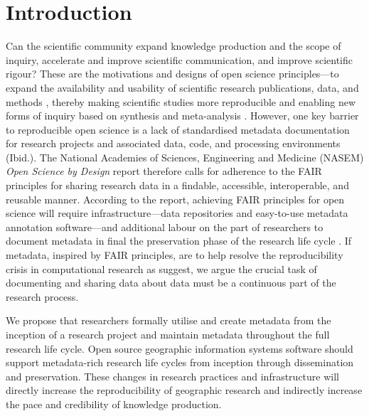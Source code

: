 \documentclass{isprs} %
\begin{document}

\maketitle


\sloppy

\section{Introduction}\label{Introduction}

Can the scientific community expand knowledge production and the scope of inquiry, accelerate and improve scientific communication, and improve scientific rigour?
These are the motivations and designs of open science principles---to expand the availability and usability of scientific research publications, data, and methods \citep{NASEM2018}, thereby making scientific studies more reproducible  and enabling new forms of inquiry based on synthesis and meta-analysis \citep{NASEM2018,NASEM2019}.
However, one key barrier to reproducible open science is a lack of standardised metadata documentation for research projects and associated data, code, and processing environments (Ibid.).
The National Academies of Sciences, Engineering and Medicine (NASEM) \textit{Open Science by Design} \citeyear{NASEM2018} report therefore calls for adherence to the FAIR principles \citep{Wilkinson2016} for sharing research data in a findable, accessible, interoperable, and reusable manner.
According to the report, achieving FAIR principles for open science will require infrastructure---data repositories and easy-to-use metadata annotation software---and additional labour on the part of researchers to document metadata in final the preservation phase of the research life cycle \citep{NASEM2018}. 
If metadata, inspired by FAIR principles, are to help resolve the reproducibility crisis in computational research as \citep{Leipzig2021} suggest, we argue the crucial task of documenting and sharing data about data must be a continuous part of the research process.

We propose that researchers formally utilise and create metadata from the inception of a research project and maintain metadata throughout the full research life cycle.
Open source geographic information systems software should support metadata-rich research life cycles from inception through dissemination and preservation.
These changes in research practices and infrastructure will directly increase the reproducibility of geographic research and indirectly increase the pace and credibility of knowledge production. 
\end{document}
